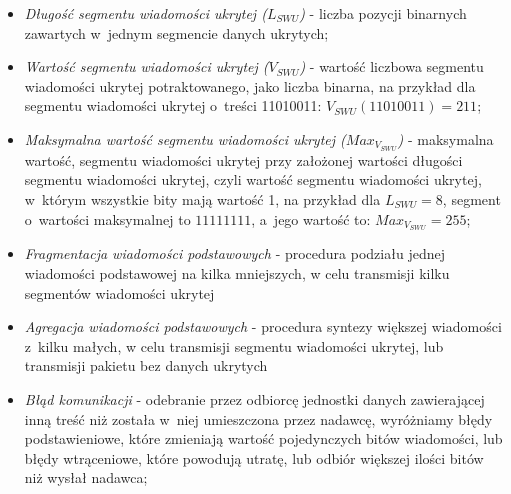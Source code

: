 \documentclass[a4paper, twoside, 12pt]{report}
\begin{document}
\begin{itemize}
        \item \emph{Długość segmentu wiadomości ukrytej (\( L_{SWU} \))} - liczba
                pozycji binarnych zawartych w~jednym segmencie danych ukrytych;

        \item \emph{Wartość segmentu wiadomości ukrytej (\( V_{SWU} \))} - wartość
            liczbowa segmentu wiadomości ukrytej potraktowanego, jako liczba binarna,
            na przykład dla segmentu wiadomości ukrytej o~treści 11010011:
            \( V_{SWU}(11010011) = 211 \);

       \item \emph{Maksymalna wartość segmentu wiadomości ukrytej (\( Max_{V_{SWU}} \))} -
           maksymalna wartość, segmentu wiadomości ukrytej przy
           założonej wartości długości segmentu wiadomości ukrytej, czyli wartość
           segmentu wiadomości ukrytej, w~którym wszystkie bity mają wartość 1,
           na przykład dla \( L_{SWU} = 8 \), segment o~wartości maksymalnej to
           \( 11111111 \), a~jego wartość to: \( Max_{V_{SWU}} = 255 \);

       \item \emph{Fragmentacja wiadomości podstawowych} -
           procedura podziału jednej wiadomości podstawowej na
           kilka mniejszych, w celu transmisji kilku segmentów wiadomości ukrytej

       \item \emph{Agregacja wiadomości podstawowych} - procedura syntezy większej wiadomości
           z~kilku małych, w celu transmisji segmentu wiadomości ukrytej, lub transmisji
           pakietu bez danych ukrytych

       \item \emph{Błąd komunikacji} - odebranie przez odbiorcę
           jednostki danych zawierającej inną treść niż została w~niej
           umieszczona przez nadawcę, wyróżniamy błędy podstawieniowe, które
           zmieniają wartość pojedynczych bitów wiadomości, lub błędy wtrąceniowe,
           które powodują utratę, lub odbiór większej ilości bitów niż wysłał nadawca;

    \end{itemize}
\end{document}
